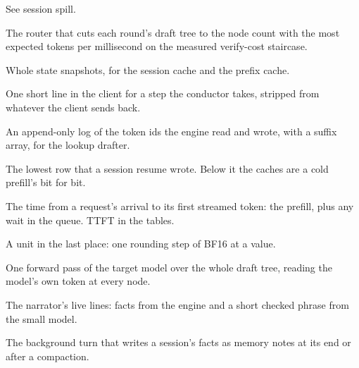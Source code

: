 \begin{description}[style=unboxed, leftmargin=0pt, itemsep=.5ex, font=\normalfont\bfseries]
\item[spill] See session spill.

\item[StairCut] The router that cuts each round's draft tree to the node count with the most expected tokens per millisecond on the measured verify-cost staircase.

\item[state store] Whole state snapshots, for the session cache and the prefix cache.

\item[status line] One short line in the client for a step the conductor takes, stripped from whatever the client sends back.

\item[suffix store] An append-only log of the token ids the engine read and wrote, with a suffix array, for the lookup drafter.

\item[taint] The lowest row that a session resume wrote. Below it the caches are a cold prefill's bit for bit.

\item[time to first token] The time from a request's arrival to its first streamed token: the prefill, plus any wait in the queue. TTFT in the tables.

\item[ulp] A unit in the last place: one rounding step of BF16 at a value.

\item[verify] One forward pass of the target model over the whole draft tree, reading the model's own token at every node.

\item[voice] The narrator's live lines: facts from the engine and a short checked phrase from the small model.

\item[writer] The background turn that writes a session's facts as memory notes at its end or after a compaction.

\end{description}
